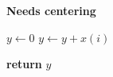 \documentclass{article}
\newcommand{\tempcaption}{}%
\newcommand{\templabel}{}%
\newenvironment{customalgo}[3][0.7\textwidth]
{%
    \begin{minipage}{#1}
        \begin{algorithm}[H]
            \centering
            \gdef\tempcaption{#2}%
            \gdef\templabel{#3}%
            \begin{algorithmic}[1]
            }%
            {%
            \end{algorithmic}
            \caption{\tempcaption}%
            \label{\templabel}
        \end{algorithm}
    \end{minipage}
    \smallskip
}%
\begin{document}
\textbf{Needs centering}\par
\begin{center}
    \begin{customalgo}[{0.6\textwidth}]{Computing a Sum - needs centering}{alg:algosumnonmakebox}

        \State $y\gets0$
         
        \State $y\gets y+x(i)$ 
        \EndFor

        \State \textbf{return}  $y$
        \EndProcedure
    \end{customalgo}
\end{center}
\end{document}
